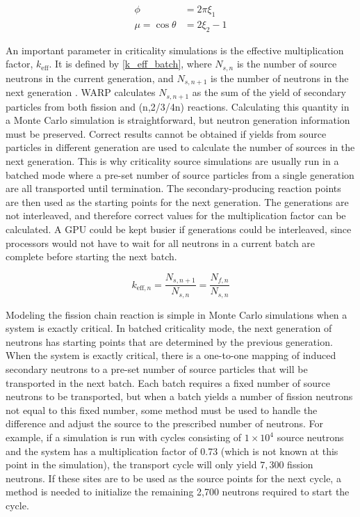 \begin{equation}
\label{iso_samp}
\begin{split}
\phi &= 2 \pi \xi_1 \\
\mu= \cos \theta &= 2 \xi_2 -1
\end{split}
\end{equation}

An important parameter in criticality simulations is the effective multiplication factor, $k_\mathrm{eff}$.  It is defined by \eqref{k_eff_batch}, where $N_{s,n}$ is the number of source neutrons in the current generation, and $N_{s,n+1}$ is the number of neutrons in the next generation \cite{jaakko}.  WARP calculates $N_{s,n+1}$ as the sum of the yield of secondary particles from both fission and (n,2/3/4n) reactions.  Calculating this quantity in a Monte Carlo simulation is straightforward, but neutron generation information must be preserved.  Correct results cannot be obtained if yields from source particles in different generation are used to calculate the number of sources in the next generation.  This is why criticality source simulations are usually run in a batched mode where a pre-set number of source particles from a single generation are all transported until termination.  The secondary-producing reaction points are then used as the starting points for the next generation.  The generations are not interleaved, and therefore correct values for the multiplication factor can be calculated.  A GPU could be kept busier if generations could be interleaved, since processors would not have to wait for all neutrons in a current batch are complete before starting the next batch.

\begin{equation}
\label{k_eff_batch}
k_{\mathrm{eff},n} = \frac{N_{s,n+1}}{N_{s,n}} = \frac{N_{f,n}}{N_{s,n}}
\end{equation}

Modeling the fission chain reaction is simple in Monte Carlo simulations when a system is exactly critical.  In batched criticality mode, the next generation of neutrons has starting points that are determined by the previous generation.  When the system is exactly critical, there is a one-to-one mapping of induced secondary neutrons to a pre-set number of source particles that will be transported in the next batch.   Each batch requires a fixed number of source neutrons to be transported, but when a batch yields a number of fission neutrons not equal to this fixed number, some method must be used to handle the difference and adjust the source to the prescribed number of neutrons.  For example, if a simulation is run with cycles consisting of $1\times10^4$ source neutrons and the system has a multiplication factor of 0.73 (which is not known at this point in the simulation), the transport cycle will only yield $7,300$ fission neutrons.  If these sites are to be used as the source points for the next cycle, a method is needed to initialize the remaining 2,700 neutrons required to start the cycle.

